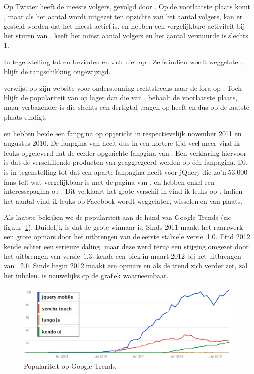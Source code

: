 Op Twitter heeft \jqm{} de meeste volgers, gevolgd door \kendo.
Op de voorlaatste plaats komt \lungo{}, maar als het aantal  wordt uitgezet ten opzichte van het aantal volgers, kan er gesteld worden dat \lungo{} het meest actief is.
\jqm{} en \kendo{} hebben een vergelijkbare activiteit bij het sturen van .
\st{} heeft het minst aantal volgers en het aantal verstuurde  is slechts 1.


In tegenstelling tot \jqm{} en \lungo{} bevinden \kendo{} en \st{} zich niet op \gh{}.
Zelfs indien \gh{} wordt weggelaten, blijft de rangschikking ongewijzigd.

\kendo{} verwijst op zijn website voor ondersteuning rechtstreeks naar de fora op \so{}. 
Toch blijft de populariteit van \kendo{} op \so{} lager dan die van \jqm{}.
\st{} behaalt de voorlaatste plaats, maar verbazender is \lungo{} die slechts een dertigtal vragen op \so{} heeft en dus op de laatste plaats eindigt.

\kendo{} en \jqm{} hebben beide een fanpgina op \fb{} opgericht in respectievelijk november 2011 en augustus 2010.
De fanpgina van \kendo{} heeft dus in een kortere tijd veel meer vind-ik-leuks opgeleverd dat de eerder opgerichte fanpgina van \jqm{}.
Een verklaring hiervoor is dat de verschillende producten van \kendo{} geaggregeerd werden op één fanpagina. 
Dit is in tegenstelling tot \jqm{} dat een aparte fanpagina heeft voor jQuery die zo'n 53.000 fans telt wat vergelijkbaar is met de pagina van \kendo{}.
\st{} en \lungo{} hebben enkel een interessepagina op \fb.
Dit verklaart het grote verschil in vind-ik-leuks op \fb.
Indien het aantal vind-ik-leuks op Facebook wordt weggelaten, wisselen \kendo{} en \jqm{} van plaats.

Als laatste bekijken we de populariteit aan de hand van Google Trends (zie figuur~\ref{fig:google-trends}).
Duidelijk is dat \jqm{} de grote winnaar is.
Sinds 2011 maakt het raamwerk een grote opmars door het uitbrengen van de eerste stabiele versie~1.0.
Eind 2012 kende \jqm{} echter een serieuze daling, maar deze werd terug een stijging omgezet door het uitbrengen van versie~1.3. 
\st{} kende een piek in maart 2012 bij het uitbrengen van \st{}~2.0.
Sinds begin 2012 maakt \kendo{} een opmars en als de trend zich verder zet, zal het \st{} inhalen.
\lungo{} is nauwelijks op de grafiek waarneembaar.

\begin{figure}[H]
  \centering
  \includegraphics[width=\textwidth]{figuren/google-trends.png}
  \caption{Populariteit op Google Trends.}
  \label{fig:google-trends}
\end{figure}
